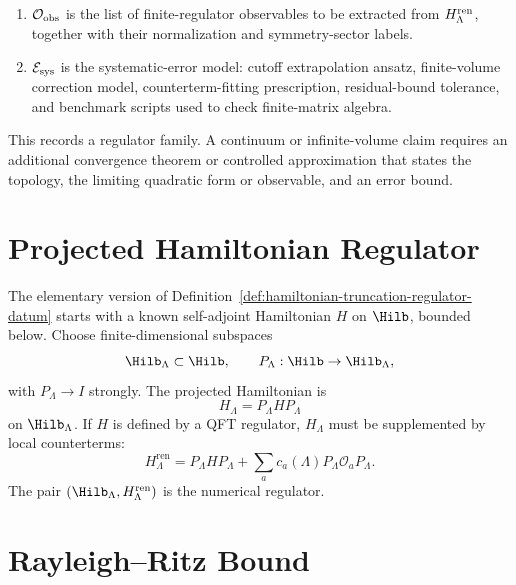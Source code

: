 \begin{definition}
\begin{enumerate}[label=\textnormal{(\roman*)}]
\[    =
    P_\Lambda H P_\Lambda
    +
    \sum_{a\in\mathcal A_{\rm ct}}
    c_a(\Lambda)P_\Lambda\mathcal O_aP_\Lambda
  \]
  when the formal operator expression is meaningful; otherwise the same
  formula denotes the finite quadratic form specified in the basis
  \(\mathcal B_\Lambda\).
\item \(\mathcal O_{\rm obs}\) is the list of finite-regulator observables to
  be extracted from \(H_\Lambda^{\rm ren}\), together with their normalization
  and symmetry-sector labels.
\item \(\mathcal E_{\rm sys}\) is the systematic-error model: cutoff
  extrapolation ansatz, finite-volume correction model, counterterm-fitting
  prescription, residual-bound tolerance, and benchmark scripts used to
  check finite-matrix algebra.
\end{enumerate}
This records a regulator family.  A continuum or infinite-volume claim
requires an additional convergence theorem or controlled approximation that
states the topology, the limiting quadratic form or observable, and an error
bound.
\end{definition}

\section{Projected Hamiltonian Regulator}

The elementary version of Definition~\ref{def:hamiltonian-truncation-regulator-datum}
starts with a known self-adjoint Hamiltonian \(H\) on \(\Hilb\), bounded
below.  Choose finite-dimensional subspaces
\[
  \Hilb_\Lambda\subset\Hilb,\qquad P_\Lambda:\Hilb\to\Hilb_\Lambda,
\]
with \(P_\Lambda\to I\) strongly.  The projected Hamiltonian is
\[
  H_\Lambda=P_\Lambda H P_\Lambda
  \]
on \(\Hilb_\Lambda\).  If \(H\) is defined by a QFT regulator, \(H_\Lambda\)
must be supplemented by local counterterms:
\[
  H_\Lambda^{\mathrm{ren}}
  =
  P_\Lambda H P_\Lambda
  +
  \sum_a c_a(\Lambda)P_\Lambda\mathcal O_aP_\Lambda.
\]
The pair \((\Hilb_\Lambda,H_\Lambda^{\mathrm{ren}})\) is the numerical
regulator.

\section{Rayleigh--Ritz Bound}

